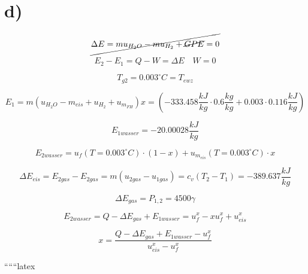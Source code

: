 

\section*{d)}

\[
\cancel{\Delta E = m u_{H_2O} - m u_{H_2} + \cancel{GPE} = 0}
\]

\[
E_2 - E_1 = Q - W = \Delta E \quad W = 0
\]

\[
T_{g2} = 0.003^\circ C = T_{ewz}
\]

\[
E_1 = m (u_{H_2O} - m_{eis} + u_{H_2} + u_{m_{FH}}) x = (-333.458 \frac{kJ}{kg} \cdot 0.6 \frac{kg}{kg} + 0.003 \cdot 0.116 \frac{kJ}{kg})
\]

\[
E_{1 wasser} = -20.00028 \frac{kJ}{kg}
\]

\[
E_{2 wasser} = u_f (T = 0.003^\circ C) \cdot (1 - x) + u_{m_{eis}} (T = 0.003^\circ C) \cdot x
\]

\[
\Delta E_{eis} = E_{2 gas} - E_{2 gas} = m (u_{2 gas} - u_{1 gas}) = c_v (T_2 - T_1) = -389.637 \frac{kJ}{kg}
\]

\[
\Delta E_{gas} = P_{1,2} = 4500 \gamma
\]

\[
E_{2 wasser} = Q - \Delta E_{gas} + E_{1 wasser} = u_f^x - x u_f^x + u_{eis}^x
\]

\[
x = \frac{Q - \Delta E_{gas} + E_{1 wasser} - u_f^x}{u_{eis}^x - u_f^x}
\]

``````latex